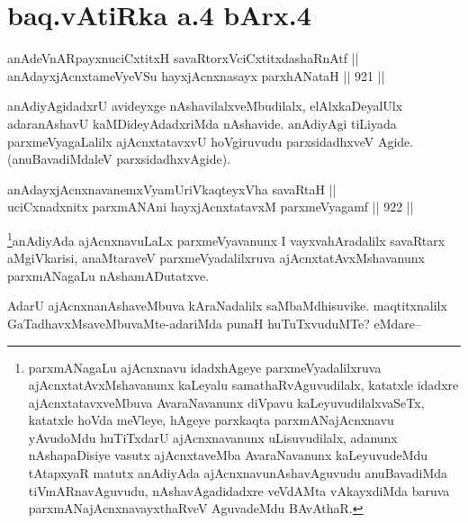 \section*{baq.vAtiRka a.4 bArx.4}


\begin{shl}
anAdeVnARpayxnuciCxtitxH savaRtorxVciCxtitxdashaRnAtf || \\
anAdayxjAcnxtameVyeVSu hayxjAcnxnasayx parxhANataH \hfill || 921 ||  
\end{shl}

\begin{artha}
anAdiyAgidadxrU avideyxge nAshavilalxveMbudilalx, elAlxkaDeyalUlx adaranAshavU kaMDideyAdadxriMda nAshavide. anAdiyAgi tiLiyada parxmeVyagaLalilx ajAcnxtatavxvU hoVgiruvudu parxsidadhxveV Agide.(anuBavadiMdaleV parxsidadhxvAgide).
\end{artha}


\begin{shl}
anAdayxjAcnxnavanemxVyamUriVkaqteyxVha savaRtaH || \\
uciCxnadxnitx parxmANAni hayxjAcnxtatavxM parxmeVyagamf \hfill || 922 ||  
\end{shl}

\begin{artha}
\footnote{parxmANagaLu ajAcnxnavu idadxhAgeye parxmeVyadalilxruva ajAcnxtatAvxMshavanunx kaLeyalu samathaRvAguvudilalx, katatxle idadxre ajAcnxtatavxveMbuva AvaraNavanunx diVpavu kaLeyuvudilalxvaSeTx, katatxle hoVda meVleye, hAgeye parxkaqta parxmANajAcnxnavu yAvudoMdu huTiTxdarU ajAcnxnavanunx uLisuvudilalx, adanunx nAshapaDisiye vasutx ajAcnxtaveMba AvaraNavanunx kaLeyuvudeMdu tAtapxyaR matutx anAdiyAda ajAcnxnavunAshavAguvudu anuBavadiMda tiVmARnavAguvudu, nAshavAgadidadxre veVdAMta vAkayxdiMda baruva parxmANajAcnxnavayxthaRveV AguvadeMdu BAvAthaR.}anAdiyAda ajAcnxnavuLaLx parxmeVyavanunx I vayxvahAradalilx savaRtarx aMgiVkarisi, anaMtaraveV parxmeVyadalilxruva ajAcnxtatAvxMshavanunx parxmANagaLu nAshamADutatxve.
\end{artha}

\begin{artha}
AdarU ajAcnxnanAshaveMbuva kAraNadalilx saMbaMdhisuvike. maqtitxnalilx GaTadhavxMsaveMbuvaMte-adariMda punaH huTuTxvuduMTe? eMdare--
\end{artha}

